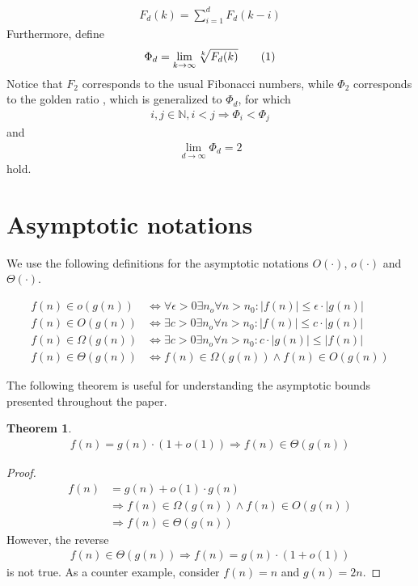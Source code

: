 \documentclass[a4paper,12pt]{article}
\newcommand\numberthis{\addtocounter{equation}{1}\tag{\theequation}}
\newcommand\neqn[1]{\numberthis\label{eqn:#1}}
\newtheorem{theorem}{Theorem}
\begin{document}
\begin{align*}
F_d(k) = \sum_{i=1}^{d}F_d(k-i)
\end{align*}
Furthermore, define 
\begin{align*}
\Phi_d = \lim_{k \rightarrow \infty} \sqrt[k]{F_d(k)} \neqn{goldenFib}
\end{align*}
Notice that $F_2$ corresponds to the usual Fibonacci numbers, while $\Phi_2 $ corresponds to the golden ratio \cite{Knuth73}, which is generalized to $\Phi_d$, for which 
\begin{align*}
i, j \in \mathbb{N}, i < j \Rightarrow \Phi_i < \Phi_j
\end{align*}
and 
\begin{align*}
\lim_{d\rightarrow \infty} \Phi_d = 2
\end{align*}
hold.

\section{Asymptotic notations}
\label{sec:asymptotic}
We use the following definitions for the asymptotic notations $O(\cdot)$, $o(\cdot)$ and $\Theta(\cdot)$.

\begin{align*}
f(n) \in o(g(n)) &\Leftrightarrow \forall \epsilon > 0 \exists n_o\forall n> n_0: |f(n)|\leq \epsilon \cdot |g(n)|\\
f(n) \in O(g(n)) &\Leftrightarrow \exists c > 0 \exists n_o\forall n> n_0: |f(n)|\leq c \cdot |g(n)|\\
f(n) \in \Omega(g(n)) &\Leftrightarrow \exists c > 0 \exists n_o\forall n> n_0: c \cdot |g(n)| \leq |f(n)| \\
f(n) \in \Theta(g(n)) &\Leftrightarrow f(n) \in \Omega(g(n)) \land f(n)\in O(g(n))
\end{align*}

The following theorem is useful for understanding the asymptotic bounds presented throughout the paper.
\begin{theorem}\label{theorem:asymptotic}
\begin{align*}
f(n) = g(n) \cdot (1+o(1)) \Rightarrow f(n) \in \Theta(g(n)) 
\end{align*}
\end{theorem}
\begin{proof}
\begin{align*}
f(n) &= g(n)+o(1)\cdot g(n) \\
&\Rightarrow f(n) \in \Omega(g(n)) \land f(n) \in O(g(n)) \\
&\Rightarrow f(n) \in \Theta(g(n))
\end{align*}
However, the reverse
\begin{align*}
f(n) \in \Theta(g(n)) \Rightarrow f(n) = g(n) \cdot (1+o(1)) 
\end{align*}
is not true. As a counter example, consider $f(n) = n$ and $g(n) = 2n$.
\end{proof}
\end{document}

